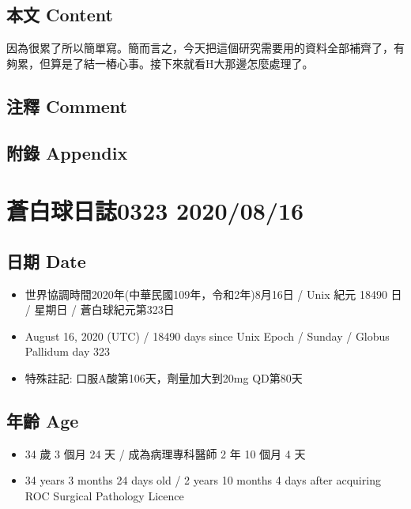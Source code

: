 \documentclass[a5paper, 11pt
]{book}
\providecommand{\tightlist}{%
  \setlength{\itemsep}{0pt}\setlength{\parskip}{0pt}}
\begin{document}
\hypertarget{ux672cux6587-content-65}{%
\subsection{本文 Content}\label{ux672cux6587-content-65}}

因為很累了所以簡單寫。簡而言之，今天把這個研究需要用的資料全部補齊了，有夠累，但算是了結一樁心事。接下來就看H大那邊怎麼處理了。

\hypertarget{ux6ce8ux91cb-comment-65}{%
\subsection{注釋 Comment}\label{ux6ce8ux91cb-comment-65}}

\hypertarget{ux9644ux9304-appendix-65}{%
\subsection{附錄 Appendix}\label{ux9644ux9304-appendix-65}}

\hypertarget{ux84bcux767dux7403ux65e5ux8a8c0323-20200816}{%
\section{蒼白球日誌0323
2020/08/16}\label{ux84bcux767dux7403ux65e5ux8a8c0323-20200816}}

\hypertarget{ux65e5ux671f-date-66}{%
\subsection{日期 Date}\label{ux65e5ux671f-date-66}}

\begin{itemize}
\tightlist
\item
  世界協調時間2020年(中華民國109年，令和2年)8月16日 / Unix 紀元 18490 日
  / 星期日 / 蒼白球紀元第323日
\item
  August 16, 2020 (UTC) / 18490 days since Unix Epoch / Sunday / Globus
  Pallidum day 323
\item
  特殊註記: 口服A酸第106天，劑量加大到20mg QD第80天
\end{itemize}

\hypertarget{ux5e74ux9f61-age-66}{%
\subsection{年齡 Age}\label{ux5e74ux9f61-age-66}}

\begin{itemize}
\tightlist
\item
  34 歲 3 個月 24 天 / 成為病理專科醫師 2 年 10 個月 4 天
\item
  34 years 3 months 24 days old / 2 years 10 months 4 days after
  acquiring ROC Surgical Pathology Licence
\end{itemize}
\end{document}

